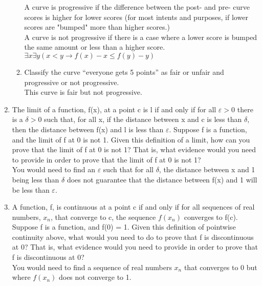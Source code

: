 \documentclass{article}
\begin{document}
\begin{enumerate}
\begin{enumerate}
                        A curve is progressive if the difference between the post- and pre- curve scores is higher for lower scores (for most intents and purposes, if lower scores are "bumped" more than higher scores.)\\
                        A curve is not progressive if there is a case where a lower score is bumped the same amount or less than a higher score. $\exists x \exists y (x < y \to f(x) - x \leq f(y) - y)$
                  \item Classify the curve “everyone gets 5 points” as fair or unfair and progressive or not progressive.\\
                        This curve is fair but not progressive.
            \end{enumerate}
      \item The limit of a function, f(x), at a point c is l if and only if for all $\varepsilon > 0$ there is a $\delta > 0$
            such that, for all x, if the distance between x and c is less than $\delta$, then the distance between
            f(x) and l is less than $\varepsilon$. Suppose f is a function, and the limit of f at 0 is not 1. Given
            this definition of a limit, how can you prove that the limit of f at 0 is not 1? That is, what
            evidence would you need to provide in order to prove that the limit of f at 0 is not 1?\\
            You would need to find an $\varepsilon$ such that for all $\delta$, the distance between x and 1 being less than $\delta$ does not guarantee that the distance between f(x) and 1 will be less than $\varepsilon$.
      \item A function, f, is continuous at a point c if and only if for all sequences of real numbers,
            $x_{n}$, that converge to c, the sequence $f(x_{n})$ converges to f(c). Suppose f is a function, and
            f(0) = 1. Given this definition of pointwise continuity above, what would you need to do
            to prove that f is discontinuous at 0? That is, what evidence would you need to provide in
            order to prove that f is discontinuous at 0?\\
            You would need to find a sequence of real numbers $x_{n}$ that converges to 0 but where $f(x_{n})$ does not converge to 1.
\end{enumerate}
\end{document}
